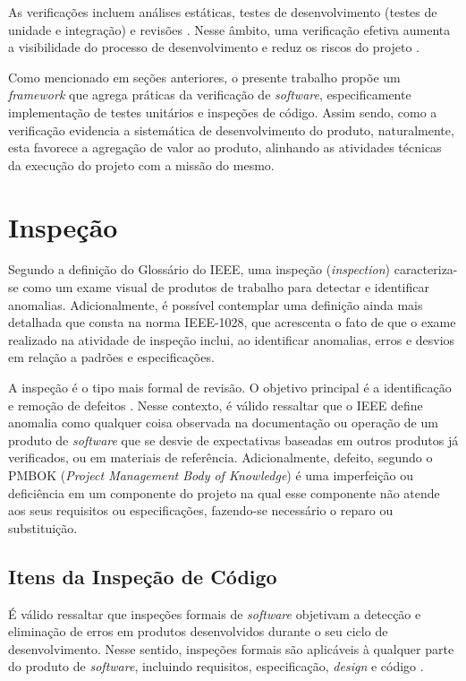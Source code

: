 As verificações incluem análises estáticas, testes de desenvolvimento (testes de unidade e integração) e revisões \cite{paulafilho}. Nesse âmbito, uma verificação efetiva aumenta a visibilidade do processo de desenvolvimento e reduz os riscos do projeto \cite{verificacao1}.

Como mencionado em seções anteriores, o presente trabalho propõe um \textit{framework} que agrega práticas da verificação de \textit{software}, especificamente implementação de testes unitários e inspeções de código. Assim sendo, como a verificação evidencia a sistemática de desenvolvimento do produto, naturalmente, esta favorece a agregação de valor ao produto, alinhando as atividades técnicas da execução do projeto com a missão do mesmo.

\section{Inspeção}

Segundo a definição do Glossário do IEEE, uma inspeção (\textit{inspection}) caracteriza-se como um exame visual de produtos de trabalho para detectar e identificar anomalias. Adicionalmente, é possível contemplar uma definição ainda mais detalhada que consta na norma IEEE-1028, que acrescenta o fato de que o exame realizado na atividade de inspeção inclui, ao identificar anomalias, erros e desvios em relação a padrões e especificações.

A inspeção é o tipo mais formal de revisão. O objetivo principal é a identificação e remoção de defeitos \cite{paulafilho}. Nesse contexto, é válido ressaltar que o IEEE define anomalia como qualquer coisa observada na documentação ou operação de um produto de \textit{software} que se desvie de expectativas baseadas em outros produtos já verificados, ou em materiais de referência. Adicionalmente, defeito, segundo o PMBOK (\textit{Project Management Body of Knowledge}) é uma imperfeição ou deficiência em um componente do projeto na qual esse componente não atende aos seus requisitos ou especificações, fazendo-se necessário o reparo ou substituição.

\subsection{Itens da Inspeção de Código}

É válido ressaltar que inspeções formais de \textit{software} objetivam a detecção e eliminação de erros em produtos desenvolvidos durante o seu ciclo de desenvolvimento. Nesse sentido, inspeções formais são aplicáveis à qualquer parte do produto de \textit{software}, incluindo requisitos, especificação, \textit{design} e código \cite{inspecao1}.

